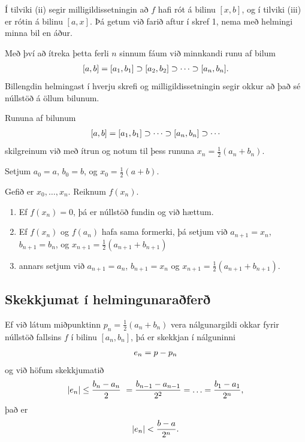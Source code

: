 \documentclass[letterpaper,10pt,icelandic]{sphinxmanual}
\begin{document}
Í tilviki (ii) segir milligildissetningin að \(f\) hafi rót á bilinu
\([x,b]\), og í tilviki (iii) er rótin á bilinu \([a,x]\). Þá
getum við farið aftur í skref 1, nema með helmingi minna bil en áður.

Með því að ítreka þetta ferli \(n\) sinnum fáum við minnkandi runu
af bilum
\begin{gather}
\begin{split}[a,b]=[a_1,b_1]\supset [a_2,b_2]\supset \cdots\supset [a_n,b_n].\end{split}\notag
\end{gather}
Billengdin helmingast í hverju skrefi og milligildissetningin segir okkur að það sé núllstöð á öllum bilunum.

Rununa af bilunum
\begin{gather}
\begin{split}[a,b]= [a_1,b_1]\supset \cdots\supset [a_n,b_n]\supset \cdots\end{split}\notag
\end{gather}
skilgreinum við með ítrun og notum til þess rununa \(x_n=\frac 12(a_n+b_n)\).

Setjum \(a_0=a\), \(b_0=b\), og \(x_0=\frac 12(a+b)\).

Gefið er \(x_0,\dots,x_n\). Reiknum \(f(x_n)\).
\begin{enumerate}
\item {} 
Ef \(f(x_n) = 0\), þá er núllstöð fundin og við hættum.

\item {} 
Ef \(f(x_n)\) og \(f(a_n)\) hafa sama formerki, þá setjum við \(a_{n+1}=x_n\), \(b_{n+1}=b_n\), og  \(x_{n+1}=\frac 12(a_{n+1}+b_{n+1})\)

\item {} 
annars setjum við \(a_{n+1}=a_n\), \(b_{n+1}=x_n\) og \(x_{n+1}=\frac 12(a_{n+1}+b_{n+1})\).

\end{enumerate}


\subsection{Skekkjumat í helmingunaraðferð}
\label{kafli02:skekkjumat-i-helmingunarafer}
Ef við látum miðpunktinn \(p_n=\frac 12(a_n+b_n)\) vera
nálgunargildi okkar fyrir núllstöð fallsins \(f\) í bilinu
\([a_n,b_n]\), þá er skekkjan í nálguninni
\begin{gather}
\begin{split}e_n=p-p_n\end{split}\notag
\end{gather}
og við höfum skekkjumatið
\begin{gather}
\begin{split}|e_n|\leq  \dfrac{b_n - a_n}{2}\
= \frac{b_{n-1}-a_{n-1}}{2^2} = \ldots = \dfrac{b_1-a_1}{2^{n}},\end{split}\notag
\end{gather}
það er
\begin{gather}
\begin{split}|e_n| < \dfrac{b-a}{2^{n}}.\end{split}\notag
\end{gather}
\end{document}
